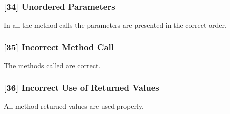 \subsubsection{[34] Unordered Parameters}
In all the method calls the parameters are presented in the correct order.


\subsubsection{[35] Incorrect Method Call}
The methods called are correct.


\subsubsection{[36] Incorrect Use of Returned Values}
All method returned values are used properly.


